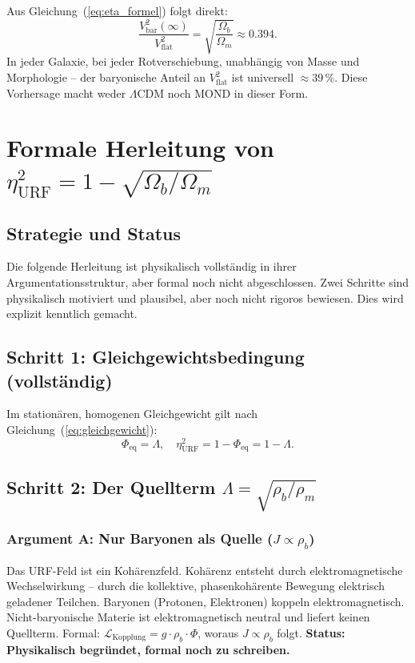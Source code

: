 \documentclass[12pt,a4paper]{article}
\theoremstyle{definition}
\begin{document}
Aus Gleichung~(\ref{eq:eta_formel}) folgt direkt:
\begin{equation}
\boxed{\frac{V_{\mathrm{bar}}^2(\infty)}{V_{\mathrm{flat}}^2}
= \sqrt{\frac{\Omega_b}{\Omega_m}} \approx 0.394.}
\label{eq:vorhersage}
\end{equation}
In jeder Galaxie, bei jeder Rotverschiebung, unabhängig von Masse und
Morphologie -- der baryonische Anteil an $V_{\mathrm{flat}}^2$ ist
universell $\approx 39\,\%$. Diese Vorhersage macht weder $\Lambda$CDM
noch MOND in dieser Form.

\section{Formale Herleitung von $\eta_{\mathrm{URF}}^2 = 1 - \sqrt{\Omega_b/\Omega_m}$}
\label{sec:herleitung}

\subsection{Strategie und Status}

Die folgende Herleitung ist physikalisch vollständig in ihrer
Argumentationsstruktur, aber formal noch nicht abgeschlossen. Zwei
Schritte sind physikalisch motiviert und plausibel, aber noch nicht
rigoros bewiesen. Dies wird explizit kenntlich gemacht.

\subsection{Schritt 1: Gleichgewichtsbedingung (vollständig)}

Im stationären, homogenen Gleichgewicht gilt nach
Gleichung~(\ref{eq:gleichgewicht}):
\begin{equation}
\Phi_{\mathrm{eq}} = \Lambda, \quad
\eta_{\mathrm{URF}}^2 = 1 - \Phi_{\mathrm{eq}} = 1 - \Lambda.
\end{equation}

\subsection{Schritt 2: Der Quellterm $\Lambda = \sqrt{\rho_b/\rho_m}$}

\subsubsection{Argument A: Nur Baryonen als Quelle ($J \propto \rho_b$)}

Das URF-Feld ist ein Kohärenzfeld. Kohärenz entsteht durch
elektromagnetische Wechselwirkung -- durch die kollektive,
phasenkohärente Bewegung elektrisch geladener Teilchen. Baryonen
(Protonen, Elektronen) koppeln elektromagnetisch. Nicht-baryonische
Materie ist elektromagnetisch neutral und liefert keinen Quellterm.
Formal: $\mathcal{L}_{\mathrm{Kopplung}} = g \cdot \rho_b \cdot \Phi$,
woraus $J \propto \rho_b$ folgt.
\textbf{Status: Physikalisch begründet, formal noch zu schreiben.}
\end{document}
